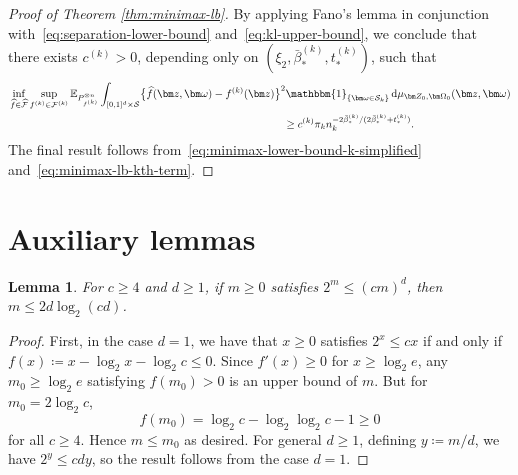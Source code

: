 \documentclass[12pt]{article}
\newtheorem{lemma}[thm]{Lemma}
\def\hat{\widehat}
\begin{document}
\begin{proof}[Proof of Theorem \ref{thm:minimax-lb}]
    By applying Fano's lemma \citet[Corollary~8.12]{samworth2025statistics} in conjunction with~\eqref{eq:separation-lower-bound} and~\eqref{eq:kl-upper-bound}, we conclude that there exists $c^{(k)} > 0$, depending only on $(\xi_2, \bar{\beta}_*^{(k)}, t_*^{(k)})$, such that
    \begin{align}
        &\inf_{\hat{f} \in \hat{\mathcal{F}}} \sup_{f^{(k)} \in \mathcal{F}^{(k)}}  \mathbb{E}_{P_{f^{(k)}}^{\otimes n}}\int_{[0,1]^d \times \mathcal{S}} \bigl\{\hat{f}(\bm z,\bm\omega) - f^{(k)}(\bm z)\bigr\}^2 \mathbbm{1}_{\{\bm\omega\in\mathcal{S}_k\}} \, \mathrm{d}\mu_{\bm Z_0,\bm\Omega_0}(\bm z, \bm \omega) \nonumber\\
        &\hspace{9cm}\geq c^{(k)} \pi_k n_k^{-2\bar{\beta}_*^{(k)} / (2\bar{\beta}_*^{(k)} + t_*^{(k)})}. \label{eq:minimax-lb-kth-term}
    \end{align}
    The final result follows from~\eqref{eq:minimax-lower-bound-k-simplified} and~\eqref{eq:minimax-lb-kth-term}.
\end{proof}



\section{Auxiliary lemmas}
\begin{lemma}\label{lemma:LambertW}
    For $c\geq 4$ and $d\geq 1$, if $m \geq 0$ satisfies $2^m \leq (cm)^d$, then $m\leq 2d\log_2(cd)$.
\end{lemma}
\begin{proof}
    First, in the case $d=1$, we have that $x \geq 0$ satisfies $2^x\leq cx$ if and only if $f(x)\coloneqq x-\log_2 x - \log_2 c \leq 0$. Since $f'(x) \geq 0$ for $x \geq \log_2 e$, any $m_0\geq \log_2 e$ satisfying $f(m_0) > 0$ is an upper bound of $m$.  But for $m_0 = 2\log_2 c$, 
    \[  
    f(m_0) = \log_2 c - \log_2\log_2 c - 1 \geq 0
    \]
    for all $c \geq 4$. Hence $m\leq m_0$ as desired. For general $d\geq 1$, defining $y \coloneqq m/d$, we have $2^y\leq cd y$, so the result follows from the case $d=1$.
\end{proof}
\end{document}
